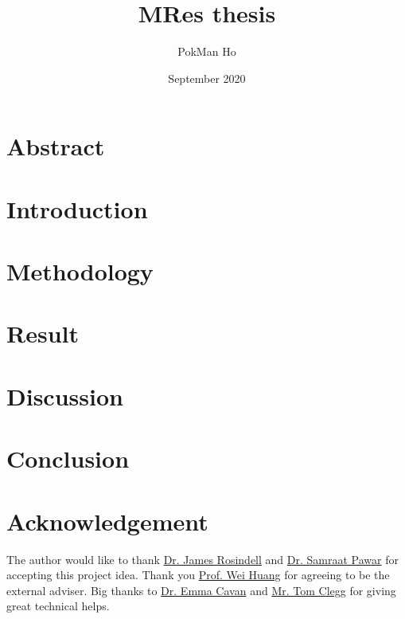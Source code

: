 \documentclass[a4paper,11pt]{article}
\title{MRes thesis}
\author{PokMan Ho}
\date{September 2020}
\begin{document}
\maketitle

\section{Abstract}


\section{Introduction}


\section{Methodology}


\section{Result}


\section{Discussion}


\section{Conclusion}


\section{Acknowledgement}
The author would like to thank\autocite{giraldo2014plant} \href{mailto:j.rosindell@imperial.ac.uk}{Dr. James Rosindell} and \href{mailto:s.pawar@imperial.ac.uk}{Dr. Samraat Pawar} for accepting this project idea.  Thank you \href{mailto:wei.huang@eng.ox.ac.uk}{Prof. Wei Huang} for agreeing to be the external adviser.  Big thanks to \href{mailto:e.cavan@imperial.ac.uk}{Dr. Emma Cavan} and \href{mailto:t.clegg17@imperial.ac.uk}{Mr. Tom Clegg} for giving great technical helps.

\nocite{*}\printbibliography
\end{document}
